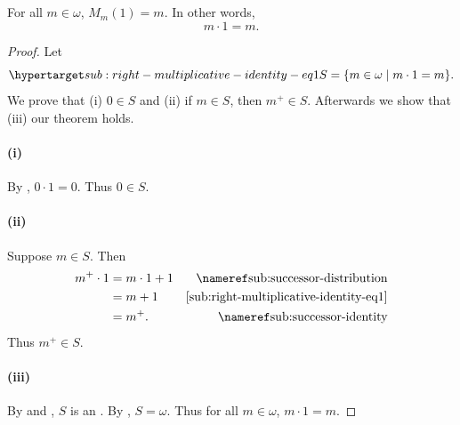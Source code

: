 \documentclass{report}
\begin{document}
\subsection{}%

\begin{lemma}

  For all $m \in \omega$, $M_m(1) = m$.
  In other words, $$m \cdot 1 = m.$$

\end{lemma}

\begin{proof}


  Let
    \begin{equation}
      \hyperlabel{sub:right-multiplicative-identity-eq1}
      S = \{m \in \omega \mid m \cdot 1 = m\}.
    \end{equation}
  We prove that (i) $0 \in S$ and (ii) if $m \in S$, then $m^+ \in S$.
  Afterwards we show that (iii) our theorem holds.

  \paragraph{(i)}%

    By , $0 \cdot 1 = 0$.
    Thus $0 \in S$.

  \paragraph{(ii)}%

    Suppose $m \in S$.
    Then
      \begin{align*}
        m^+ \cdot 1
          & = m \cdot 1 + 1 & \textref{sub:successor-distribution} \\
          & = m + 1 & \eqref{sub:right-multiplicative-identity-eq1} \\
          & = m^+. & \textref{sub:successor-identity}
      \end{align*}
    Thus $m^+ \in S$.

  \paragraph{(iii)}%

    By  and
      , $S$
      is an .
    By , $S = \omega$.
    Thus for all $m \in \omega$, $m \cdot 1 = m$.

\end{proof}
\end{document}
